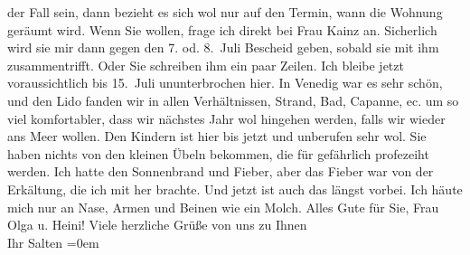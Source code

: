 \begin{ledgroupsized}[t]{13cm}
               der Fall sein, dann bezieht es sich wol nur auf den Termin, wann die Wohnung geräumt
               wird. Wenn Sie wollen, frage ich direkt bei Frau Kainz an. Sicherlich wird sie mir dann gegen den 7. od. 8. Juli Bescheid geben, sobald sie
               mit ihm zusammentrifft. Oder Sie schreiben ihm ein paar Zeilen. Ich bleibe jetzt
               voraussichtlich bis 15. Juli ununterbrochen hier. In Venedig war es sehr schön, und den Lido fanden wir in allen Verhältnissen, Strand, Bad, Capanne,
               ec. um so viel komfortabler, dass wir nächstes Jahr wol hingehen werden, falls wir
               wieder ans Meer wollen. Den Kindern ist hier bis jetzt und unberufen sehr wol. Sie
               haben nichts von den kleinen Übeln bekommen, die für gefährlich profezeiht werden.
               Ich hatte den Sonnenbrand und Fieber, aber das Fieber war von der Erkältung, die ich
               mit her brachte. Und jetzt ist auch das längst vorbei. Ich häute mich nur an Nase,
               Armen und Beinen wie ein Molch. Alles Gute für Sie, Frau Olga u. Heini!\pend
           \pstart
           Viele herzliche Grüße von uns zu Ihnen {\\[\baselineskip]}Ihr \spacefill\mbox{Salten}\pend
           \leftskip=0em{}
         
         \endnumbering{}\end{ledgroupsized}  \newcommand{\dateiname}{L03501}\newcommand{\titel}{Felix Salten an Arthur Schnitzler, 29. 6. 1909}\newcommand{\editorInnen}{Martin Anton Müller und Laura Untner}
      